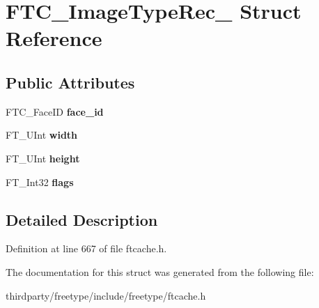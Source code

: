 \hypertarget{struct_f_t_c___image_type_rec__}{}\section{F\+T\+C\+\_\+\+Image\+Type\+Rec\+\_\+ Struct Reference}
\label{struct_f_t_c___image_type_rec__}
\subsection*{Public Attributes}
\begin{DoxyCompactItemize}
\item 
\mbox{\label{struct_f_t_c___image_type_rec___a9851b8d4a06baacd18d5b9856fd85abd}} 
F\+T\+C\+\_\+\+Face\+ID {\bfseries face\+\_\+id}
\item 
\mbox{\label{struct_f_t_c___image_type_rec___abd2bc251e7dbded1932e25841a41ab71}} 
F\+T\+\_\+\+U\+Int {\bfseries width}
\item 
\mbox{\label{struct_f_t_c___image_type_rec___a29ac83aa58a7d9d669d27ddcbb970f95}} 
F\+T\+\_\+\+U\+Int {\bfseries height}
\item 
\mbox{\label{struct_f_t_c___image_type_rec___a391782ed8c67de86591c71f276ea6454}} 
F\+T\+\_\+\+Int32 {\bfseries flags}
\end{DoxyCompactItemize}


\subsection{Detailed Description}


Definition at line 667 of file ftcache.\+h.



The documentation for this struct was generated from the following file\+:\begin{DoxyCompactItemize}
\item 
thirdparty/freetype/include/freetype/ftcache.\+h\end{DoxyCompactItemize}
